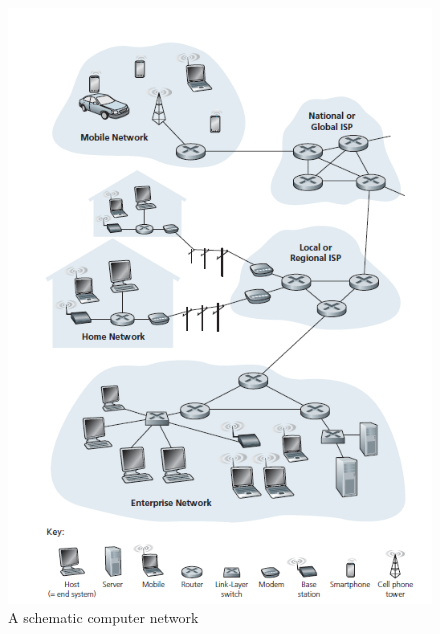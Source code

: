 \documentclass{article}
\theoremstyle{plain}
\theoremstyle{definition}
\begin{document}
\begin{figure}[h]
    \centering
    \includegraphics{cn1.png}
    \caption{A schematic computer network}
    \label{fig:my_label}
\end{figure}
\end{document}
